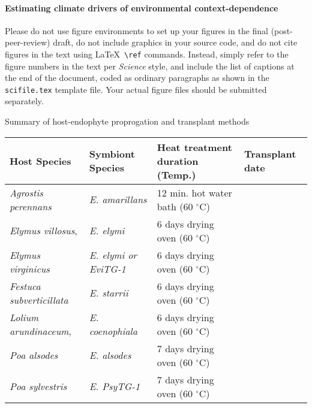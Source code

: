 \documentclass[12pt]{article}
\begin{document}
\paragraph*{Estimating climate drivers of environmental context-dependence}




\clearpage

 Please do not use figure environments to set
up your figures in the final (post-peer-review) draft, do not include graphics in your
source code, and do not cite figures in the text using \LaTeX\
\verb+\ref+ commands.  Instead, simply refer to the figure numbers in
the text per {\it Science\/} style, and include the list of captions at
the end of the document, coded as ordinary paragraphs as shown in the
\texttt{scifile.tex} template file.  Your actual figure files should
be submitted separately.

 Summary of host-endophyte proprogation and transplant methods\\
\begin{table}[ht]
	\begin{adjustbox}{width=1\textwidth}
\begin{tabular}{llll}

	\bf{Host Species} & \bf{Symbiont Species} & \bf{Heat treatment duration (Temp.)}& \bf{Transplant date }\\
	        \hline
	\emph{Agrostis perennans} & \emph{E. amarillans}&12 min. hot water bath (60 $^{\circ}$C)&\\
	\emph{Elymus villosus}, &\emph{E. elymi}&6 days drying oven (60 $^{\circ}$C)&\\
	\emph{Elymus virginicus} &\emph{E. elymi or EviTG-1}&6 days drying oven (60 $^{\circ}$C)&\\
	 \emph{Festuca subverticillata} &\emph{E. starrii}&6 days drying oven (60 $^{\circ}$C)&\\
	 \emph{Lolium arundinaceum}, &\emph{E. coenophiala}&6 days drying oven (60 $^{\circ}$C)& \\
	 \emph{Poa alsodes} &\emph{E. alsodes}& 7 days drying oven (60 $^{\circ}$C)&\\
	 \emph{Poa sylvestris}&\emph{E. PsyTG-1}&7 days drying oven (60 $^{\circ}$C)& \\
\end{tabular}
\end{adjustbox}
\end{table}
\end{document}
